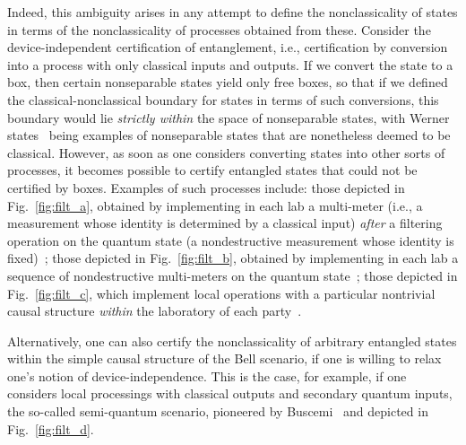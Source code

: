 \documentclass[12pt]{article}
\theoremstyle{plain}
\theoremstyle{definition}
\begin{document}
Indeed, this ambiguity arises in any attempt 
  to define the nonclassicality of states in terms of the nonclassicality of processes obtained from these. 
   Consider the device-independent certification of entanglement, i.e., certification by 
   conversion into a process with only classical inputs and outputs.  
    If we convert the state to a box,
    then certain nonseparable states yield only free boxes, so that if we defined the classical-nonclassical boundary for states in terms of such conversions, this boundary would lie {\em strictly within} the space of nonseparable states, with Werner states~\cite{werner1989quantum} being examples of nonseparable states that are nonetheless deemed to be classical.   
However, as soon as one considers converting states into other sorts of processes, it becomes possible to certify entangled states that could not be certified by boxes.  Examples of such processes
include: those depicted in Fig.~\ref{fig:filt_a}, obtained by implementing in each lab a multi-meter (i.e., a measurement whose identity is determined by a classical input) {\em after} a filtering operation on the quantum state (a nondestructive measurement whose identity is fixed)~\cite{popescu1995bell,gisin1996hidden}; those depicted in Fig.~\ref{fig:filt_b}, obtained by implementing in each lab a sequence of nondestructive multi-meters on the quantum state~\cite{gallego2014nonlocality}; those depicted in Fig.~\ref{fig:filt_c}, which implement 
local operations with a particular nontrivial causal structure {\em within} the laboratory of each party~\cite{bowles2018device}.

Alternatively, one can also certify the nonclassicality of arbitrary entangled states within the simple causal structure of the Bell scenario, if one is willing to relax one's notion of device-independence. This is the case, for example, if one considers local processings with classical outputs and secondary quantum inputs, the so-called semi-quantum scenario, pioneered by Buscemi~\cite{Buscemi2012LOSR} and depicted in Fig.~\ref{fig:filt_d}.
\end{document}
